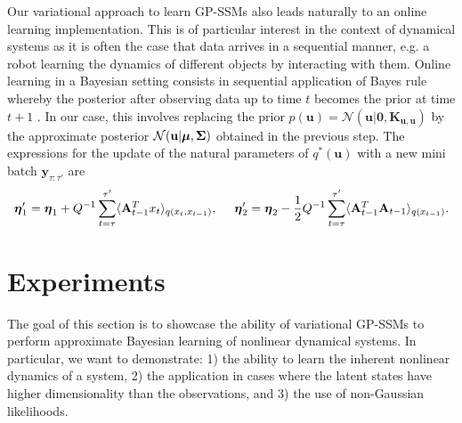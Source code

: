 \documentclass{article} %
\newcommand{\n}[1]{\mathbf{#1}}
\newcommand{\x}{\mathbf{x}}
\newcommand{\y}{\mathbf{y}}
\newcommand{\bSigma}{\boldsymbol\Sigma}
\begin{document}
Our variational approach to learn GP-SSMs also leads naturally to an online learning implementation. This is of particular interest in the context of dynamical systems as it is often the case that data arrives in a sequential manner, e.g. a robot learning the dynamics of different objects by interacting with them. Online learning in a Bayesian setting consists in sequential application of Bayes rule whereby the posterior after observing data up to time $t$ becomes the prior at time $t+1$ \citep{Broderick13,Opper1998}. In our case, this involves replacing the prior $p(\n{u}) = \mathcal{N}(\n{u} | \n{0}, \n{K}_{\n{u},\n{u}})$ by the approximate posterior $\mathcal{N}(\n{u} | \bmu, \bSigma)$ obtained in the previous step. The expressions for the update of the natural parameters of $q^*(\n{u})$ with a new mini batch $\y_{\tau:\tau'}$ are
\vspace{-2mm}
\begin{equation}
	\boeta_1^\prime = \boeta_1 +  Q^{-1}\sum_{t=\tau}^{\tau'} \langle \n{A}_{t-1}^T x_{t}\rangle_{q(x_t,x_{t-1})}, 
	\quad\
\boeta_2^\prime = \boeta_2 -\ha   Q^{-1} \sum_{t=\tau}^{\tau'} \langle\n{A}^T_{t-1} \n{A}_{t-1}\rangle_{q(x_{t-1})}  . \label{eq:qstarunaturalonline}
\end{equation}



  



\vspace{-2mm}
\section{Experiments}

The goal of this section is to showcase the ability of variational GP-SSMs to perform approximate Bayesian learning of nonlinear dynamical systems. In particular, we want to demonstrate: 1) the ability to learn the inherent nonlinear dynamics of a system, 2) the application in cases where the latent states have higher dimensionality than the observations, and 3) the use of non-Gaussian likelihoods.
\end{document}
